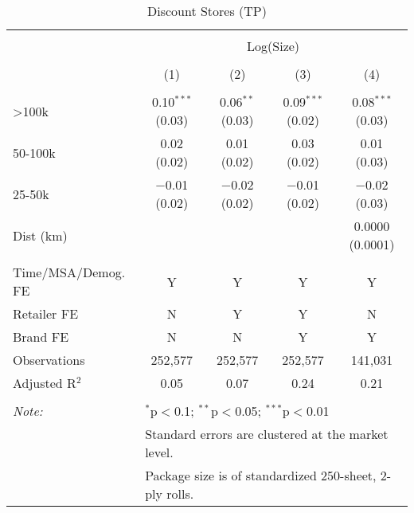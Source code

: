 
\begin{table}[!htbp] \centering 
  \caption{Discount Stores (TP)} 
  \label{tab:packageSizeDiscount} 
\begin{tabular}{@{\extracolsep{5pt}}lcccc} 
\\[-1.8ex]\hline 
\hline \\[-1.8ex] 
 & \multicolumn{4}{c}{Log(Size)} \\ 
\\[-1.8ex] & (1) & (2) & (3) & (4)\\ 
\hline \\[-1.8ex] 
 >100k & 0.10$^{***}$ (0.03) & 0.06$^{**}$ (0.03) & 0.09$^{***}$ (0.02) & 0.08$^{***}$ (0.03) \\ 
  50-100k & 0.02 (0.02) & 0.01 (0.02) & 0.03 (0.02) & 0.01 (0.03) \\ 
  25-50k & $-$0.01 (0.02) & $-$0.02 (0.02) & $-$0.01 (0.02) & $-$0.02 (0.03) \\ 
  Dist (km) &  &  &  & 0.0000 (0.0001) \\ 
 \hline \\[-1.8ex] 
Time/MSA/Demog. FE & Y & Y & Y & Y \\ 
Retailer FE & N & Y & Y & N \\ 
Brand FE & N & N & Y & Y \\ 
Observations & 252,577 & 252,577 & 252,577 & 141,031 \\ 
Adjusted R$^{2}$ & 0.05 & 0.07 & 0.24 & 0.21 \\ 
\hline 
\hline \\[-1.8ex] 
\textit{Note:}  & \multicolumn{4}{l}{$^{*}$p$<$0.1; $^{**}$p$<$0.05; $^{***}$p$<$0.01} \\ 
 & \multicolumn{4}{l}{Standard errors are clustered at the market level.} \\ 
 & \multicolumn{4}{l}{Package size is of standardized 250-sheet, 2-ply rolls.} \\ 
\end{tabular} 
\end{table} 
